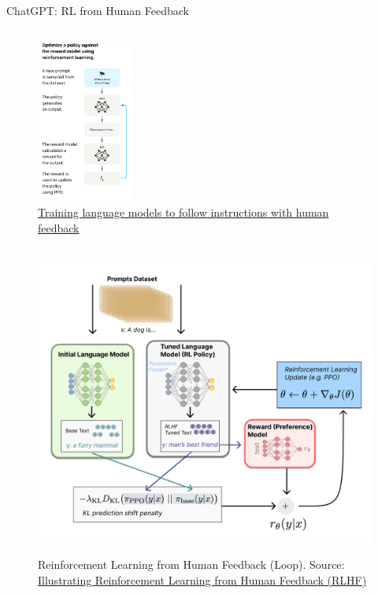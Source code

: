 \documentclass[9pt]{beamer}
\begin{document}
  
\begin{frame}{ChatGPT: RL from Human Feedback}
    \begin{column}{0.40\textwidth}
        \begin{figure}
            \centering
            \includegraphics[width = 3.2cm, height=5.4cm]{img/rlhf-chatgpt-diagram.png}
            \caption{\href{phttps://arxiv.org/pdf/2106.09685.pdf}{Training language models to follow instructions with human feedback}}
            \label{fig:enter-label}
        \end{figure}
    \end{column}
    \begin{column}{0.60\textwidth}
        \begin{figure}
            \caption{Reinforcement Learning from Human Feedback (Loop). Source: \href{https://huggingface.co/blog/rlhf}{Illustrating Reinforcement Learning from Human Feedback (RLHF)}}
            \centering
            \includegraphics[width=\textwidth]{img/rlhf-chatgpt.png}
            \label{fig:enter-label}
        \end{figure}
    \end{column}
\end{frame}
\end{document}
